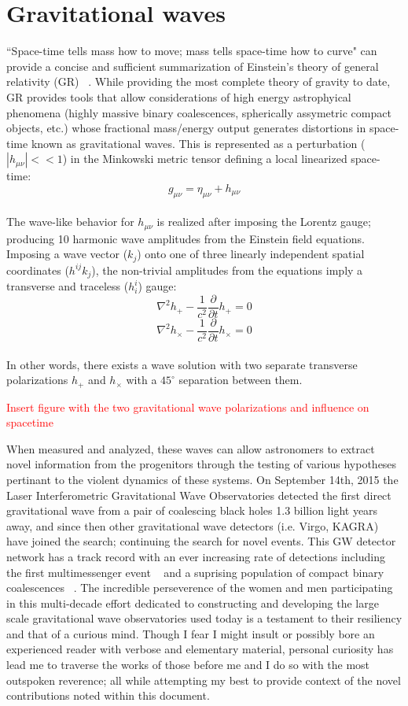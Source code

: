 \section{Gravitational waves}
``Space-time tells mass how to move; mass tells space-time how to curve" can provide a concise and sufficient summarization of Einstein's theory of general relativity (GR) ~\cite{Misner1973}. While providing the most complete theory of gravity to date, GR provides tools that allow considerations of high energy astrophyical phenomena (highly massive binary coalescences, spherically assymetric compact objects, etc.) whose fractional mass/energy output generates distortions in space-time known as gravitational waves. 
This is represented as a perturbation ($|h_{\mu \nu}|<<1$) in the Minkowski metric tensor defining a local linearized space-time:
\\
$$g_{\mu \nu} = \eta_{\mu \nu} + h_{\mu \nu}$$
\\
The wave-like behavior for $h_{\mu \nu}$ is realized after imposing the Lorentz gauge; producing 10 harmonic wave amplitudes from the Einstein field equations. Imposing a wave vector ($k_j$) onto one of three linearly independent spatial coordinates ($h^{ij}k_j$), the non-trivial amplitudes from the equations imply a transverse and traceless ($h^{i}_{i}$) gauge:
\\
$$\nabla^2 h_{+} - \frac{1}{c^2} \frac{\partial}{\partial t} h_{+} = 0$$
$$\nabla^2 h_{\times} - \frac{1}{c^2} \frac{\partial}{\partial t} h_{\times} = 0$$
\\
In other words, there exists a wave solution with two separate transverse polarizations $h_{+}$ and $h_{\times}$ with a $45^{\circ}$ separation between them. 

\textcolor{red}{Insert figure with the two gravitational wave polarizations and influence on spacetime}

When measured and analyzed, these waves can allow astronomers to extract novel information from the progenitors through the testing of various hypotheses pertinant to the violent dynamics of these systems. On September 14th, 2015 the Laser Interferometric Gravitational Wave Observatories detected the first direct gravitational wave from a pair of coalescing black holes 1.3 billion light years away, and since then other gravitational wave detectors (i.e. Virgo, KAGRA) have joined the search; continuing the search for novel events. This GW detector network has a track record with an ever increasing rate of detections including the first multimessenger event ~\cite{gw170817} and a suprising population of compact binary coalescences ~\cite{Nitz_2023}. The incredible perseverence of the women and men participating in this multi-decade effort dedicated to constructing and developing the large scale gravitational wave observatories used today is a testament to their resiliency and that of a curious mind. Though I fear I might insult or possibly bore an experienced reader with verbose and elementary material, personal curiosity has lead me to traverse the works of those before me and I do so with the most outspoken reverence; all while attempting my best to provide context of the novel contributions noted within this document. 

